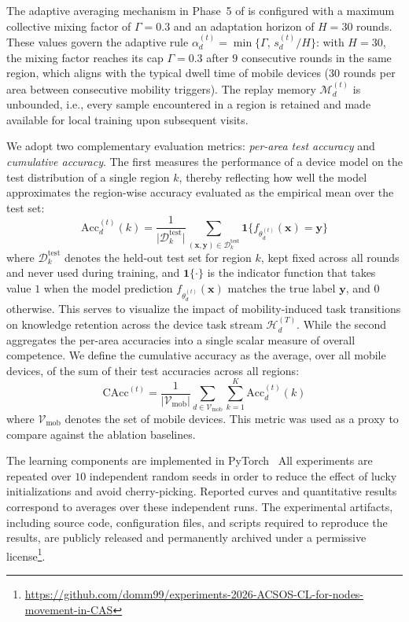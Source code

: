 \documentclass[conference]{IEEEtran}
\theoremstyle{plain}
\theoremstyle{definition}
\begin{document}

The adaptive averaging mechanism in Phase~5 of 
 is configured with a maximum collective mixing factor of $\Gamma = 0.3$
 and an adaptation horizon of $H = 30$ rounds.
%
These values govern the adaptive rule
 $\alpha_d^{(t)} = \min\{\Gamma,\, s_d^{(t)}/H\}$:
 with $H = 30$, the mixing factor reaches its cap $\Gamma = 0.3$
 after $9$ consecutive rounds in the same region,
 which aligns with the typical dwell time of mobile devices
 ($30$ rounds per area between consecutive mobility triggers).
%
The replay memory $\mathcal{M}_d^{(t)}$ is unbounded,
 i.e., every sample encountered in a region is retained
 and made available for local training upon subsequent visits.


We adopt two complementary evaluation metrics: \emph{per-area test accuracy} and \emph{cumulative accuracy}.
%
The first measures the performance of a device model
 on the test distribution of a single region $k$,
 thereby reflecting how well the model approximates the region-wise accuracy 
 evaluated as the empirical mean over the test set:
$$
    \mathrm{Acc}_d^{(t)}(k) = \frac{1}{\lvert\mathcal{D}_k^{\mathrm{test}}\rvert} \sum_{(\mathbf{x},\mathbf{y}) \in \mathcal{D}_k^{\mathrm{test}}} \mathbf{1}\{f_{\theta_d^{(t)}}(\mathbf{x}) = \mathbf{y}\}
$$
where $\mathcal{D}_k^{\mathrm{test}}$ denotes the held-out test set for region $k$, kept fixed across all rounds and never used during training, and $\mathbf{1}\{\cdot\}$ is the indicator function that takes value $1$ when the model prediction $f_{\theta_d^{(t)}}(\mathbf{x})$ matches the true label $\mathbf{y}$, and $0$ otherwise.
%
This serves to visualize the impact of mobility-induced task transitions
 on knowledge retention across the device task stream $\mathcal{H}_d^{(T)}$.
%
While the second aggregates the per-area accuracies into a single scalar measure of overall competence.
%
We define the cumulative accuracy as the average, over all mobile devices, of the sum of their test accuracies across all regions:
$$
    \mathrm{CAcc}^{(t)} = \frac{1}{\lvert\mathcal{V}_{\mathrm{mob}}\rvert} \sum_{d \in \mathcal{V}_{\mathrm{mob}}} \sum_{k=1}^{K} \mathrm{Acc}_d^{(t)}(k)
$$
where $\mathcal{V}_{\mathrm{mob}}$ denotes the set of mobile devices.
This metric was used as a proxy
 to compare \approach{} against the ablation baselines.


The learning components are implemented in PyTorch~\cite{paszke2017automatic}
%
All experiments are repeated over $10$ independent random seeds
 in order to reduce the effect of lucky initializations and avoid cherry-picking.
%
Reported curves and quantitative results correspond
 to averages over these independent runs.
%
The experimental artifacts,
 including source code, configuration files, and scripts required to reproduce the results,
 are publicly released and permanently archived under a permissive
 license\footnote{\url{https://github.com/domm99/experiments-2026-ACSOS-CL-for-nodes-movement-in-CAS}}.
\end{document}
